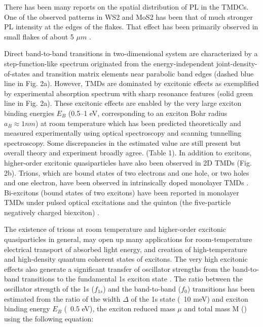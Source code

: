 	There has been many reports on the spatial distribution of PL in the TMDCs. One of the observed patterns in WS2 and MoS2 has been that of much stronger PL intensity at the edges of the flakes. That effect has been primarily observed in small flakes of about 5 $\mu m$ \cite{ExtraordinaryRoomTemperaturePhotoluminescenceInTriangularWS2Monolayers}.


Direct band-to-band transitions in two-dimensional system are characterized by a step-function-like spectrum originated from the energy-independent joint-density-of-states and transition matrix elements near parabolic band edges \cite{Haug1994} (dashed blue line in Fig. 2a). However, TMDs  are dominated by excitonic effects as exemplified by experimental absorption spectrum with sharp resonance features \cite{EmergingPhotoluminescenceInMonolayerMoS2} (solid green line in Fig. 2a).  These excitonic effects are enabled by the very large exciton binding energies $E_B$ (0.5–1 eV, corresponding to an exciton Bohr radius $a_B \approx 1 nm$)  at room temperature which has been predicted theoretically and measured experimentally using optical spectroscopy and scanning tunnelling spectroscopy. Some discrepancies in the estimated value are still present but overall theory and experiment broadly agree. (Table 1). 
In addition to excitons, higher-order excitonic quasiparticles have also been observed in 2D TMDs (Fig. 2b). Trions, which are bound states of two electrons and one hole, or two holes and one electron, have been observed in intrinsically doped monolayer TMDs \cite{Mak2012}\cite{Ross2013}. Bi-excitons (bound states of two excitons) have been reported in monolayer TMDs under pulsed optical excitations \cite{doi:10.1021/nn5059908}\cite{You2015} and the quinton (the five-particle negatively charged biexciton) \cite{Barbone2018}.
 
The existence of trions at room temperature and higher-order excitonic quasiparticles  in general, may open up many applications for room-temperature electrical transport of absorbed light energy, and creation of high-temperature and high-density quantum coherent states of excitons.
The very high excitonic effects also generate a significant transfer of oscillator strengths from the band-to-band transitions to the fundamental 1s exciton state \cite{Haug1994}. The ratio between the oscillator strength of the 1s ($f_{1s}$) and the band-to-band ($f_0$) transitions has been estimated  from the ratio of the width $\Delta$ of the 1s state (~10 meV) and exciton binding energy $E_B$ (~0.5 eV), the exciton reduced mass $\mu$ and total mass M (\cite{Feldmann1988}\cite{Haug1989}) using the following equation:

